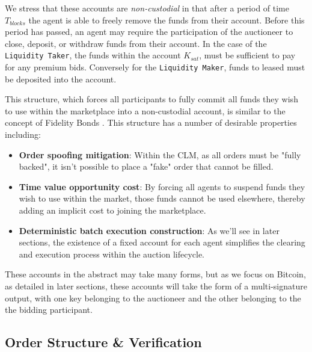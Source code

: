 \documentclass[10pt,a4paper]{article}
\theoremstyle{definition}
\begin{document}
We stress that these accounts are \emph{non-custodial} in that after a period
of time $T_{blocks}$ the agent is able to freely remove the funds from their
account. Before this period has passed, an agent may require the participation
of the auctioneer to close, deposit, or withdraw funds from their account. In
the case of the \texttt{Liquidity Taker}, the funds within the account
$K_{sat}$, must be sufficient to pay for any premium bids. Conversely for the
\texttt{Liquidity Maker}, funds to leased must be deposited into the account.

This structure, which forces all participants to fully commit all funds they
wish to use within the marketplace into a non-custodial account, is similar to
the concept of Fidelity Bonds \cite{fidelityBonds}. This structure has a number
of desirable properties including:

\begin{itemize} %
    \item \textbf{Order spoofing mitigation}: Within the CLM, as all orders
        must be "fully backed", it isn't possible to place a "fake" order that
        cannot be filled.

    \item \textbf{Time value opportunity cost}: By forcing all agents to
        suspend funds they wish to use within the market, those funds cannot be
        used elsewhere, thereby adding an implicit cost to joining the
        marketplace.

    \item \textbf{Deterministic batch execution construction}: As we'll see in
        later sections, the existence of a fixed account for each agent
        simplifies the clearing and execution process within the auction
        lifecycle. 

\end{itemize}

These accounts in the abstract may take many forms, but as we focus on Bitcoin,
as detailed in later sections, these accounts will take the form of a
multi-signature output, with one key belonging to the auctioneer and the other
belonging to the the bidding participant.


\subsection{Order Structure \& Verification}
\end{document}
